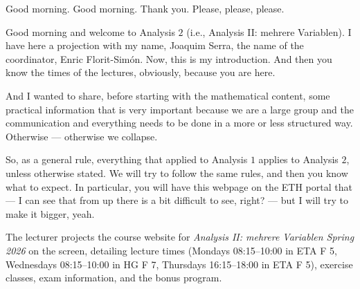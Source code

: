 \begin{spoken-clean}[00:00:00 - 00:02:30]
Good morning. Good morning. Thank you. Please, please, please.

Good morning and welcome to Analysis $2$ (i.e., Analysis II: mehrere Variablen). I have here a projection with my name, Joaquim Serra, the name of the coordinator, Enric Florit-Simón. Now, this is my introduction. And then you know the times of the lectures, obviously, because you are here.

And I wanted to share, before starting with the mathematical content, some practical information that is very important because we are a large group and the communication and everything needs to be done in a more or less structured way. Otherwise --- otherwise we collapse.

So, as a general rule, everything that applied to Analysis $1$ applies to Analysis $2$, unless otherwise stated. We will try to follow the same rules, and then you know what to expect. In particular, you will have this webpage on the ETH portal that --- I can see that from up there is a bit difficult to see, right? --- but I will try to make it bigger, yeah.
\end{spoken-clean}

\begin{meta-note}
The lecturer projects the course website for \emph{Analysis II: mehrere Variablen Spring 2026} on the screen, detailing lecture times (Mondays 08:15--10:00 in ETA F 5, Wednesdays 08:15--10:00 in HG F 7, Thursdays 16:15--18:00 in ETA F 5), exercise classes, exam information, and the bonus program.
\end{meta-note}

